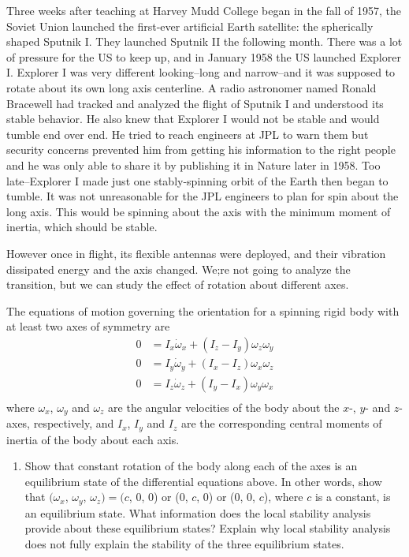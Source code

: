\documentclass[12pt,letterpaper]{hmcpset}
\begin{document}
	\begin{problem}[3]
		Three weeks after teaching at Harvey Mudd College
		began in the fall of 1957, the Soviet Union launched
		the first-ever artificial Earth satellite: the spherically shaped
		Sputnik I. They launched Sputnik II the
		following month. There was a lot of pressure for
		the US to keep up, and in January 1958 the US
		launched Explorer I. Explorer I was very different
		looking--long and narrow--and it was supposed to
		rotate about its own long axis centerline.
		A radio astronomer named Ronald Bracewell had tracked and analyzed the flight of Sputnik I
		and understood its stable behavior. He also knew that Explorer I would not be stable and
		would tumble end over end. He tried to reach engineers at JPL to warn them but security
		concerns prevented him from getting his information to the right people and he was only
		able to share it by publishing it in Nature later in 1958. Too late--Explorer I made just one
		stably-spinning orbit of the Earth then began to tumble.
		It was not unreasonable for the JPL engineers to plan for spin about the long axis. This would
		be spinning about the axis with the minimum moment of inertia, which should be stable.
		
		However once in flight, its flexible antennas were deployed, and their vibration dissipated
		energy and the axis changed. We;re not going to analyze the transition, but we can study the
		effect of rotation about different axes.
		
		The equations of motion governing the orientation for a spinning rigid body with at least
		two axes of symmetry are
		\begin{displaymath}
		\begin{split}
		0 &= I_x \dot{\omega}_x + (I_z - I_y)\omega_z\omega_y\\
		0 &= I_y \dot{\omega}_y + (I_x - I_z)\omega_x\omega_z\\
		0 &= I_z \dot{\omega}_z + (I_y - I_x)\omega_y\omega_x\\
		\end{split}
		\end{displaymath}
		where $\omega_x$, $\omega_y$ and $\omega_z$ are the angular velocities of the body about the $x$-, $y$- and $z$-axes,
		respectively, and $I_x$, $I_y$ and $I_z$ are the corresponding central moments of inertia of the body
		about each axis.
		\begin{enumerate}
			\item Show that constant rotation of the body along each of the axes is an equilibrium state of
			the differential equations above. In other words, show that $(\omega_x$, $\omega_y$, $\omega_z)=(c$, 0, 0) or (0, $c$, 0) or (0, 0, $c$), where $c$ is a constant, is an equilibrium state. What information does
			the local stability analysis provide about these equilibrium states? Explain why local
			stability analysis does not fully explain the stability of the three equilibrium states.
			

\end{enumerate}
\end{problem}
\end{document}
